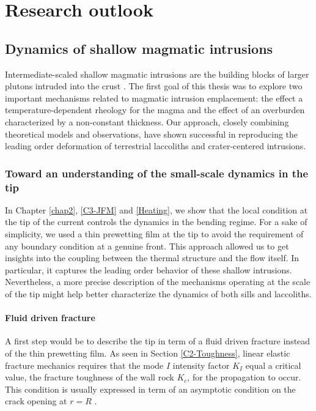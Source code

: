 \chapter{Research outlook}
\label{chap9}

\minitoc

\section{Dynamics of shallow magmatic intrusions}
\label{sec:dynam-shall-magm}

Intermediate-scaled  shallow  magmatic  intrusions  are  the  building
blocks    of    larger    plutons     intruded    into    the    crust
\citep{Petford:2000cc,Glazner:2004gv}. The  first goal of  this thesis
was to explore two important  mechanisms related to magmatic intrusion
emplacement: the effect a temperature-dependent rheology for the magma
and  the  effect of  an  overburden  characterized by  a  non-constant
thickness.   Our approach,  closely combining  theoretical models  and
observations, have  shown successful in reproducing  the leading order
deformation of terrestrial laccoliths and crater-centered intrusions.

\subsection{Toward an understanding of the small-scale dynamics in the
  tip}
\label{sec:perspectives}

In Chapter  \ref{chap2}, \ref{C3-JFM} and \ref{Heating},  we show that
the local condition at the tip of the current controls the dynamics in
the  bending  regime.  For  a  sake  of  simplicity,  we used  a  thin
prewetting film  at the tip to  avoid the requirement of  any boundary
condition at a genuine front. This approach allowed us to get insights
into  the  coupling  between  the   thermal  structure  and  the  flow
itself. In particular, it captures the leading order behavior of these
shallow intrusions.   Nevertheless, a more precise  description of the
mechanisms  operating  at the  scale  of  the  tip might  help  better
characterize the dynamics of both sills and laccoliths.

\subsubsection*{Fluid driven fracture}
\label{sec:caref-descr-tip}

A first step  would be to describe  the tip in term of  a fluid driven
fracture  instead of  the thin  prewetting  film. As  seen in  Section
\ref{C2-Toughness},  linear elastic  fracture mechanics  requires that
the  mode $I$  intensity  factor  $K_I$ equal  a  critical value,  the
fracture toughness  of the wall  rock $K_{c}$, for the  propagation to
occur.  This condition  is usually expressed in term  of an asymptotic
condition      on      the       crack      opening      at      $r=R$
\citep{Savitski:2002gy,Bunger:2005em,Bunger:2007vs,Detournay:2014fk}.

